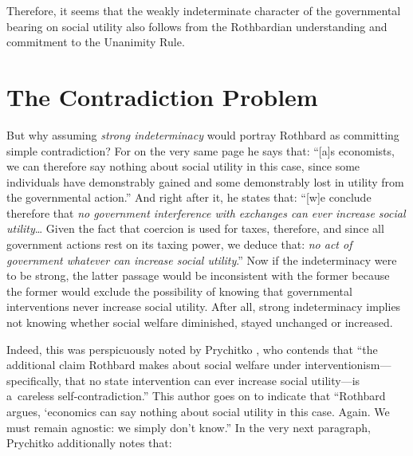 \parencite[][p.253]{rothbard_toward_2008} %
 Therefore, it seems that the weakly indeterminate character of the governmental bearing on social utility also follows from the Rothbardian understanding and commitment to the Unanimity Rule.



\section{The Contradiction Problem}

But why assuming \textit{strong indeterminacy} would portray Rothbard as committing simple contradiction? For on the very same page he says that: ``[a]s economists, we can therefore say nothing about social utility in this case, since some individuals have demonstrably gained and some demonstrably lost in utility from the governmental action.'' 
\parencite[][p.252]{rothbard_toward_2008} %
 And right after it, he states that: ``[w]e conclude therefore that \textit{no government interference with exchanges can ever increase social utility}… Given the fact that coercion is used for taxes, therefore, and since all government actions rest on its taxing power, we deduce that: \textit{no act of government whatever can increase social utility}.'' 
\parencite[][p.252]{rothbard_toward_2008} %
 Now if the indeterminacy were to be strong, the latter passage would be inconsistent with the former because the former would exclude the possibility of knowing that governmental interventions never increase social utility. After all, strong indeterminacy implies not knowing whether social welfare diminished, stayed unchanged or increased.



Indeed, this was perspicuously noted by Prychitko 
\parencite*[][p.575]{prychitko_formalism_1993}, %
 who contends that ``the additional claim Rothbard makes about social welfare under interventionism---specifically, that no state intervention can ever increase social utility---is a~careless self-contradiction.'' This author goes on to indicate that ``Rothbard argues, ‘economics can say nothing about social utility in this case. Again. We must remain agnostic: we simply don't know.'' In the very next paragraph, Prychitko 
\parencite*[][p.576]{prychitko_formalism_1993} %
 additionally notes that:



